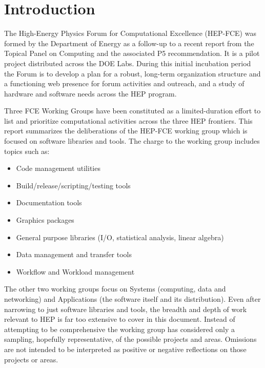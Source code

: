 \section{Introduction}

The High-Energy Physics Forum for Computational Excellence (HEP-FCE)
was formed by the Department of Energy as a follow-up to a recent
report from the Topical Panel on Computing\cite{topicalpanel} and the
associated P5 recommendation\cite{p5}.
%
It is a  pilot project distributed across the DOE Labs.  
%
During this initial incubation period the Forum is to develop a plan
for a robust, long-term organization structure and a functioning web
presence for forum activities and outreach, and a study of hardware
and software needs across the HEP program.

Three FCE Working Groups have been constituted as a limited-duration effort 
to list and prioritize computational activities across the three HEP frontiers.
This report summarizes the deliberations of the HEP-FCE working group which 
is focused on software libraries and tools. The charge to the working group 
includes topics such as:

\begin{itemize}
\item Code management utilities
\item Build/release/scripting/testing tools
\item Documentation tools
\item Graphics packages
\item General purpose libraries (I/O, statistical analysis, linear algebra)
\item  Data management and transfer tools
\item  Workflow and Workload management
\end{itemize}

The other two working groups focus on Systems (computing, data and networking)
and Applications (the software itself and its distribution).   
%
Even after narrowing to just software libraries and tools, the breadth and
depth of work relevant to HEP is far too extensive to cover in this
document.  Instead of attempting to be comprehensive the working group
has considered only a sampling, hopefully representative, of the
possible projects and areas.  Omissions are not intended to be
interpreted as positive or negative reflections on those projects or
areas.

